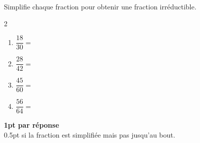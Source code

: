 
\question[4]
Simplifie chaque fraction pour obtenir une fraction irréductible.

\vspace{10pt}
\setlength{\columnsep}{50pt}
\begin{multicols}{2}
\begin{enumerate}[leftmargin=*,align=parleft, label=\alph*), itemsep=30pt]
\item $\dfrac{18}{30} =$ 
\item $\dfrac{28}{42} =$ 
\item $\dfrac{45}{60} =$ 
\item $\dfrac{56}{64} =$ 
\end{enumerate}
\end{multicols}
\setlength{\columnsep}{10pt}

\begin{solution}[0pt]
\textbf{1pt par réponse}\\[4pt]
0.5pt si la fraction est simplifiée mais pas jusqu'au bout.
\end{solution}